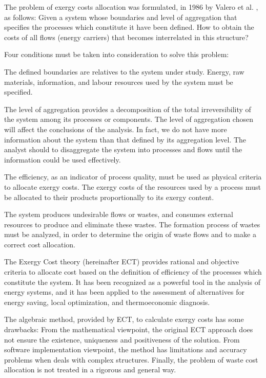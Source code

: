\documentclass{ecos2018}
\begin{document}
The problem of exergy costs allocation was formulated, in 1986 by Valero et al. \cite{Valero1986}, as follows: Given a system whose boundaries and level of aggregation that specifies the processes which constitute it have been defined. How to obtain the costs of all flows (energy carriers) that becomes interrelated in this structure?

Four conditions must be taken into consideration to solve this problem:
\begin{compactenum}[(i)]
	\item The defined boundaries are relatives to the system under study. Energy, raw materials, information, and labour resources used by the system must be specified.
	\item The level of aggregation provides a decomposition of the total irreversibility of the system among its processes or components. The level of aggregation chosen will affect the conclusions of the analysis. In fact, we do not have more information about the system than that defined by its aggregation level. The analyst should to disaggregate the system into processes and flows until the information could be used effectively.
	\item The efficiency, as an indicator of process quality, must be used as physical criteria to allocate exergy costs. The exergy costs of the resources used by a process must be allocated to their products proportionally to its exergy content.
	\item The system produces undesirable flows or wastes, and consumes external resources to produce and eliminate these wastes. The formation process of wastes must be analyzed, in order to determine the origin of waste flows and to make a correct cost allocation.
\end{compactenum}

The Exergy Cost theory \cite{ECT93} (hereinafter ECT) provides rational and objective criteria to allocate cost based on the definition of efficiency of the processes which constitute the system. It has been recognized as a powerful tool in the analysis of energy systems, and it has been applied to the assessment of alternatives for energy saving, local optimization, and thermoeconomic diagnosis.

The algebraic method, provided by ECT, to calculate exergy costs has some drawbacks: From the mathematical viewpoint, the original ECT approach does not ensure the existence, uniqueness and positiveness of the solution. From software implementation viewpoint, the method has limitations and accuracy problems when deals with complex structures. Finally, the problem of waste cost allocation is not treated in a rigorous and general way.
\end{document}

